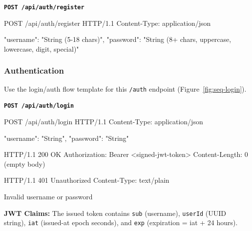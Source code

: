 \textbf{\texttt{POST /api/auth/register}}

\begin{httpexchange}
\begin{httplisting}
POST /api/auth/register HTTP/1.1
Content-Type: application/json

{
    "username": "String (5-18 chars)",
    "password": "String (8+ chars, uppercase, lowercase, digit, special)"
}
\end{httplisting}
\httpmidarrows
{}
\end{httpexchange}


\newpage



\subsubsection{Authentication}
Use the login/auth flow template for this \texttt{/auth} endpoint (Figure~\ref{fig:seq-login}).

\textbf{\texttt{POST /api/auth/login}}

\begin{httpexchange}
\begin{httplisting}
POST /api/auth/login HTTP/1.1
Content-Type: application/json

{
    "username": "String",
    "password": "String"
}
\end{httplisting}
\httpmidarrows
\begin{httplisting}
HTTP/1.1 200 OK
Authorization: Bearer <signed-jwt-token>
Content-Length: 0
(empty body)

HTTP/1.1 401 Unauthorized
Content-Type: text/plain

Invalid username or password
\end{httplisting}
\end{httpexchange}


\noindent\textbf{JWT Claims:} The issued token contains \texttt{sub} (username),
\texttt{userId} (UUID string), \texttt{iat} (issued-at epoch seconds), and
\texttt{exp} (expiration = iat + 24 hours).


